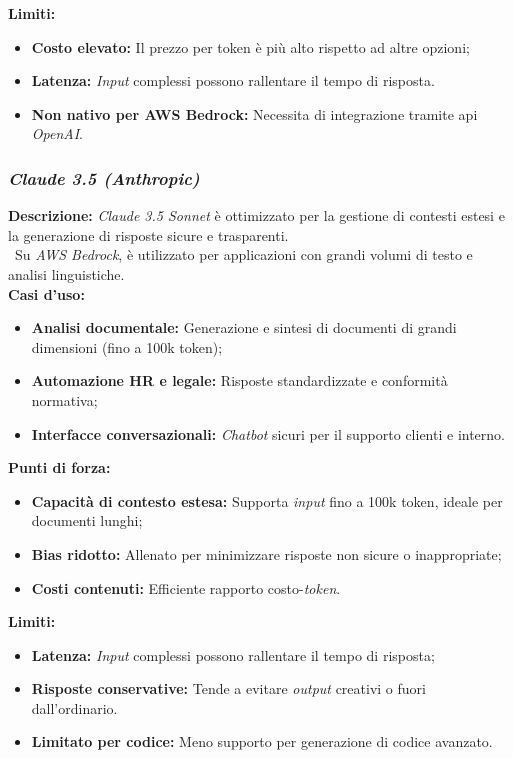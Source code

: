 \noindent \textbf{Limiti:}
\begin{itemize}
    \item \textbf{Costo elevato:} Il prezzo per \gls{token} è più alto rispetto ad altre opzioni;
    \item \textbf{Latenza:} \textit{Input} complessi possono rallentare il tempo di risposta.
    \item \textbf{Non nativo per AWS Bedrock:} Necessita di integrazione tramite \gls{api} \textit{OpenAI}.
\end{itemize}

\vspace{1.5cm}
\subsubsection{\textit{Claude 3.5 (Anthropic)}}

\noindent \textbf{Descrizione:}
\textit{Claude 3.5 Sonnet} è ottimizzato per la gestione di contesti estesi e la generazione di risposte sicure e trasparenti. \\\
Su \textit{AWS Bedrock}, è utilizzato per applicazioni con grandi volumi di testo e analisi linguistiche. \\

\noindent \textbf{Casi d’uso:}
\begin{itemize}
    \item \textbf{Analisi documentale:} Generazione e sintesi di documenti di grandi dimensioni (fino a 100k \gls{token});
    \item \textbf{Automazione HR e legale:} Risposte standardizzate e conformità normativa;
    \item \textbf{Interfacce conversazionali:} \textit{Chatbot} sicuri per il supporto clienti e interno.
\end{itemize}

\noindent \textbf{Punti di forza:}
\begin{itemize}
    \item \textbf{Capacità di contesto estesa:} Supporta \textit{input} fino a 100k \gls{token}, ideale per documenti lunghi;
    \item \textbf{Bias ridotto:} Allenato per minimizzare risposte non sicure o inappropriate;
    \item \textbf{Costi contenuti:} Efficiente rapporto costo-\textit{token}.
\end{itemize}

\noindent \textbf{Limiti:}
\begin{itemize}
    \item \textbf{Latenza:} \textit{Input} complessi possono rallentare il tempo di risposta;
    \item \textbf{Risposte conservative:} Tende a evitare \textit{output} creativi o fuori dall’ordinario.
    \item \textbf{Limitato per codice:} Meno supporto per generazione di codice avanzato.
\end{itemize}

